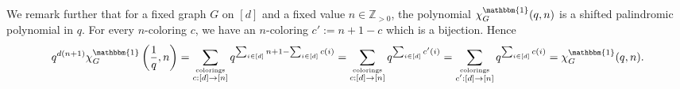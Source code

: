 \documentclass[11pt]{amsart}
\begin{document}
    We remark further that for a fixed graph $G$ on $[d]$ and a fixed value $n \in \mathbb{Z}_{>0}$, the polynomial $\chi_G^\mathbbm{1}(q,n)$ is a
shifted palindromic polynomial in $q$.
    For every $n$-coloring $c$, we have an $n$-coloring $c' := n+1-c$ which is a bijection.
    Hence
    \[
        {q^{d(n+1)} \chi_G^\mathbbm{1}\left(\frac{1}{q},n\right) =\sum_{\substack{\text{\tiny colorings} \\ c:[d] \to [n]}} q^{\sum_{i \in [d]} n+1 -\sum_{i \in [d]} c(i)} = \sum_{\substack{\text{\tiny colorings} \\ c:[d] \to [n]}} q^{\sum_{i \in [d]} c'(i)} =  \sum_{\substack{\text{\tiny colorings} \\ c':[d] \to [n]}} q^{\sum_{i \in [d]} c(i)} =  \chi_G^\mathbbm{1}(q,n)}.
    \]


\providecommand{\bysame}{\leavevmode\hbox to3em{\hrulefill}\thinspace}
\providecommand{\MR}{\relax\ifhmode\unskip\space\fi MR }
\providecommand{\MRhref}[2]{%
  \href{http://www.ams.org/mathscinet-getitem?mr=#1}{#2}
}
\providecommand{\href}[2]{#2}
\end{document}
